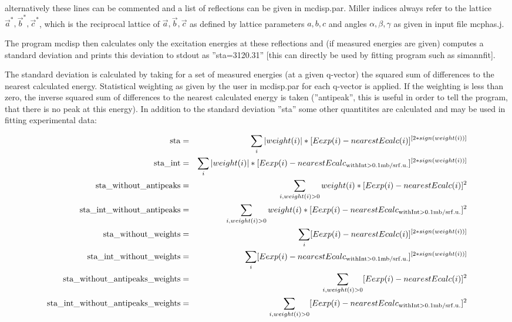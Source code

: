 alternatively these lines can be commented and a
list of reflections can be given in {\prg mcdisp.par}.
Miller indices always refer to the lattice $\vec a^*, \vec b^*, \vec c^*$, which
is the reciprocal lattice of $\vec a, \vec b, \vec c$ as defined by lattice
parameters $a,b,c$ and angles $\alpha,\beta,\gamma$ as given in
input file {\prg mcphas.j}.


The
program {\prg mcdisp} then calculates only 
the excitation energies at these reflections and (if measured
energies are given) computes a standard deviation
and prints
this deviation to stdout as ''sta=3120.31'' [this can directly
be used by fitting program such as {\prg simannfit}].

The standard deviation is calculated by taking for a set of measured energies (at a 
given q-vector) the squared sum of differences to the nearest
calculated energy. Statistical weighting as given by the user in {\prg mcdisp.par}
for each q-vector is applied. If the weighting is less than zero, the 
inverse squared sum of differences to the nearest
calculated energy is taken (''antipeak'', this is useful in order to 
tell the program, that there is no peak at this energy).
In addition to the standard deviation ''sta'' some other quantitites are calculated and 
may be used in fitting experimental data:

\begin{eqnarray}
{\rm sta}                              & =& \sum_i |weight(i)|*[Eexp(i) - nearestEcalc(i)]^{[2*sign(weight(i))]}\\
{\rm sta\_int   }                       & = &\sum_i |weight(i)|*[Eexp(i) - nearestEcalc_{\rm with %
Int>0.1mb/srf.u.}]^{[2*sign(weight(i))]}\\
{\rm sta\_without\_antipeaks }           & =& \sum_{i, weight(i)>0}  weight(i)*[Eexp(i) - nearestEcalc(i)]^2\\
{\rm sta\_int\_without\_antipeaks }       & =&\sum_{i,weight(i)>0}  weight(i)*[Eexp(i) - nearestEcalc_{\rm with %
Int>0.1mb/srf.u.}]^2\\
{\rm sta\_without\_weights }              &=& \sum_i [Eexp(i) - nearestEcalc(i)]^{[2*sign(weight(i))]}\\
{\rm sta\_int\_without\_weights}          & =&\sum_i [Eexp(i) - nearestEcalc_{\rm with %
Int>0.1mb/srf.u.}]^{[2*sign(weight(i))]}\\
{\rm sta\_without\_antipeaks\_weights}    & = &\sum_{i, weight(i)>0}[Eexp(i) - nearestEcalc(i)]^2\\
{\rm sta\_int\_without\_antipeaks\_weights}& =& \sum_{i, weight(i)>0} [Eexp(i) - nearestEcalc_{\rm with %
Int>0.1mb/srf.u.}]^2\\
\end{eqnarray}



